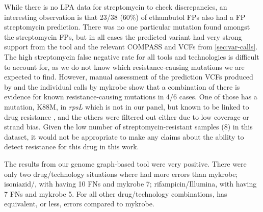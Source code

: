 While there is no LPA data for streptomycin to check discrepancies, an interesting observation is that 23/38 (60\%) of ethambutol FPs also had a FP streptomycin prediction. There was no one particular mutation found amongst the streptomycin FPs, but in all cases the predicted variant had very strong support from the tool and the relevant COMPASS and \bcftools{} VCFs from \autoref{sec:var-calls}. The high streptomycin false negative rate for all tools and technologies is difficult to account for, as we do not know which resistance-causing mutations we are expected to find. However, manual assessment of the prediction VCFs produced by \drprg{} and the individual calls by mykrobe show that a combination of there is evidence for known resistance-causing mutations in 4/6 cases. One of those has a mutation, K88M, in \textit{rpsL} which is not in our panel, but known to be linked to drug resistance \cite{Smittipat2016}, and the others were filtered out either due to low coverage or strand bias. Given the low number of streptomycin-resistant samples (8) in this dataset, it would not be appropriate to make any claims about the ability to detect resistance for this drug in this work.

The results from our genome graph-based tool \drprg{} were very positive. There were only two drug/technology situations where \drprg{} had more errors than mykrobe; isoniazid/\ont{}, with \drprg{} having 10 FNs and mykrobe 7; rifampicin/Illumina, with \drprg{} having 7 FNs and mykrobe 5. For all other drug/technology combinations, \drprg{} has equivalent, or less, errors compared to mykrobe.

